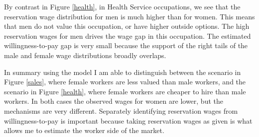 \documentclass[11pt]{article}
\begin{document}
By contrast in Figure \ref{health}, in Health Service occupations, we see that the reservation wage distribution for men is much higher than for women. This means that men do not value this occupation, or have higher outside options. The high reservation wages for men drives the wage gap in this occupation. The estimated willingness-to-pay gap is very small because the support of the right tails of the male and female wage distributions broadly overlaps.


In summary using the model I am able to distinguish between the scenario in Figure \ref{sales}, where female workers are less valued than male workers, and the scenario in Figure \ref{health}, where female workers are cheaper to hire than male workers. In both cases the observed wages for women are lower, but the mechanisms are very different. Separately identifying reservation wages from willingness-to-pay is important because taking reservation wages as given is what allows me to estimate the worker side of the market.





\end{document}
